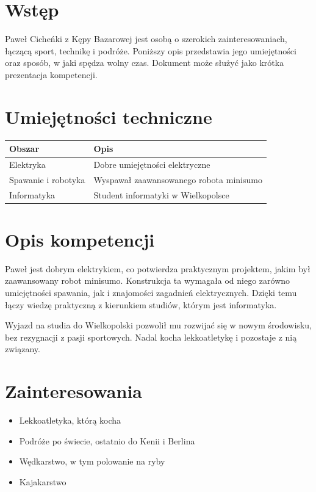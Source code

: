 \section*{Wstęp}
Paweł Cicheńki z Kępy Bazarowej jest osobą o szerokich zainteresowaniach, łączącą sport, technikę i podróże. Poniższy opis przedstawia jego umiejętności oraz sposób, w jaki spędza wolny czas. Dokument może służyć jako krótka prezentacja kompetencji.

\section*{Umiejętności techniczne}
\begin{tabularx}{\textwidth}{@{}lX@{}}
\toprule
\textbf{Obszar} & \textbf{Opis} \\
\midrule
Elektryka & Dobre umiejętności elektryczne \\
Spawanie i robotyka & Wyspawał zaawansowanego robota minisumo \\
Informatyka & Student informatyki w Wielkopolsce \\
\bottomrule
\end{tabularx}

\vspace{0.4cm}

\section*{Opis kompetencji}
Paweł jest dobrym elektrykiem, co potwierdza praktycznym projektem, jakim był zaawansowany robot minisumo. Konstrukcja ta wymagała od niego zarówno umiejętności spawania, jak i znajomości zagadnień elektrycznych. Dzięki temu łączy wiedzę praktyczną z kierunkiem studiów, którym jest informatyka.

Wyjazd na studia do Wielkopolski pozwolił mu rozwijać się w nowym środowisku, bez rezygnacji z pasji sportowych. Nadal kocha lekkoatletykę i pozostaje z nią związany.

\section*{Zainteresowania}
\begin{itemize}
\item Lekkoatletyka, którą kocha
\item Podróże po świecie, ostatnio do Kenii i Berlina
\item Wędkarstwo, w tym polowanie na ryby
\item Kajakarstwo
\end{itemize}

